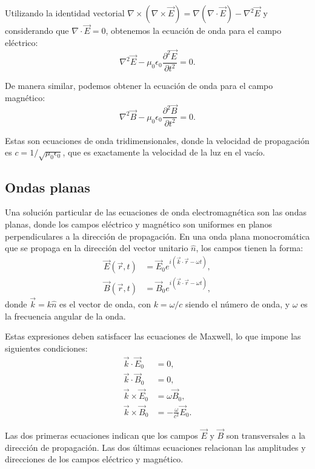 \documentclass[12pt,a4paper]{book}
\begin{document}
Utilizando la identidad vectorial $\nabla \times (\nabla \times \vec{E}) = \nabla(\nabla \cdot \vec{E}) - \nabla^2\vec{E}$ y considerando que $\nabla \cdot \vec{E} = 0$, obtenemos la ecuación de onda para el campo eléctrico:
\begin{equation}
\nabla^2\vec{E} - \mu_0 \epsilon_0 \frac{\partial^2 \vec{E}}{\partial t^2} = 0.
\end{equation}

De manera similar, podemos obtener la ecuación de onda para el campo magnético:
\begin{equation}
\nabla^2\vec{B} - \mu_0 \epsilon_0 \frac{\partial^2 \vec{B}}{\partial t^2} = 0.
\end{equation}

Estas son ecuaciones de onda tridimensionales, donde la velocidad de propagación es $c = 1/\sqrt{\mu_0 \epsilon_0}$, que es exactamente la velocidad de la luz en el vacío.

\subsection{Ondas planas}

Una solución particular de las ecuaciones de onda electromagnética son las ondas planas, donde los campos eléctrico y magnético son uniformes en planos perpendiculares a la dirección de propagación. En una onda plana monocromática que se propaga en la dirección del vector unitario $\hat{n}$, los campos tienen la forma:
\begin{align}
\vec{E}(\vec{r}, t) &= \vec{E}_0 e^{i(\vec{k} \cdot \vec{r} - \omega t)}, \\
\vec{B}(\vec{r}, t) &= \vec{B}_0 e^{i(\vec{k} \cdot \vec{r} - \omega t)},
\end{align}
donde $\vec{k} = k\hat{n}$ es el vector de onda, con $k = \omega/c$ siendo el número de onda, y $\omega$ es la frecuencia angular de la onda.

Estas expresiones deben satisfacer las ecuaciones de Maxwell, lo que impone las siguientes condiciones:
\begin{align}
\vec{k} \cdot \vec{E}_0 &= 0, \\
\vec{k} \cdot \vec{B}_0 &= 0, \\
\vec{k} \times \vec{E}_0 &= \omega \vec{B}_0, \\
\vec{k} \times \vec{B}_0 &= -\frac{\omega}{c^2} \vec{E}_0.
\end{align}

Las dos primeras ecuaciones indican que los campos $\vec{E}$ y $\vec{B}$ son transversales a la dirección de propagación. Las dos últimas ecuaciones relacionan las amplitudes y direcciones de los campos eléctrico y magnético.
\end{document}
